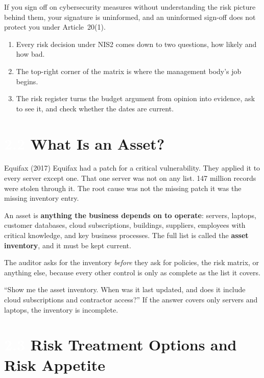 \documentclass[11pt,a4paper,twoside]{book}
\newcommand{\lessontag}[1]{%
  \texorpdfstring{%
    \setlength{\fboxsep}{3pt}\colorbox{nisd2blue}{\textcolor{white}{\footnotesize\bfseries #1}}\quad%
  }{Lesson #1\ }%
}
\begin{document}
If you sign off on cybersecurity measures without understanding the risk picture behind them, your signature is uninformed, and an uninformed sign-off does not protect you under Article~20(1).

\begin{keytakeaways}
\begin{enumerate}
  \item Every risk decision under NIS2 comes down to two questions, how likely and how bad.
  \item The top-right corner of the matrix is where the management body's job begins.
  \item The risk register turns the budget argument from opinion into evidence, ask to see it, and check whether the dates are current.
\end{enumerate}
\end{keytakeaways}

\section{\lessontag{2.2}What Is an Asset?}

\begin{casestudy}{Equifax (2017)}
Equifax had a patch for a critical vulnerability. They applied it to every server except one. That one server was not on any list. 147 million records were stolen through it. The root cause was not the missing patch  it was the missing inventory entry.
\end{casestudy}

An asset is \textbf{anything the business depends on to operate}: servers, laptops, customer databases, cloud subscriptions, buildings, suppliers, employees with critical knowledge, and key business processes. The full list is called the \textbf{asset inventory}, and it must be kept current.

The auditor asks for the inventory \emph{before} they ask for policies, the risk matrix, or anything else, because every other control is only as complete as the list it covers.

\begin{actionbox}
``Show me the asset inventory. When was it last updated, and does it include cloud subscriptions and contractor access?''
If the answer covers only servers and laptops, the inventory is incomplete.
\end{actionbox}

\section{\lessontag{2.3}Risk Treatment Options and Risk Appetite}
\end{document}

